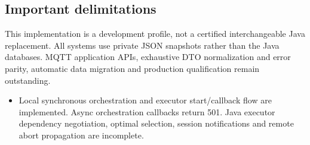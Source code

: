 \documentclass[a4paper]{arrowhead}
\begin{document}
\subsection{Important delimitations}
This implementation is a development profile, not a certified interchangeable Java replacement. All systems use private JSON snapshots rather than the Java databases. MQTT application APIs, exhaustive DTO normalization and error parity, automatic data migration and production qualification remain outstanding.
\begin{itemize}
\item Local synchronous orchestration and executor start/callback flow are implemented. Async orchestration callbacks return 501. Java executor dependency negotiation, optimal selection, session notifications and remote abort propagation are incomplete.
\end{itemize}
\end{document}
